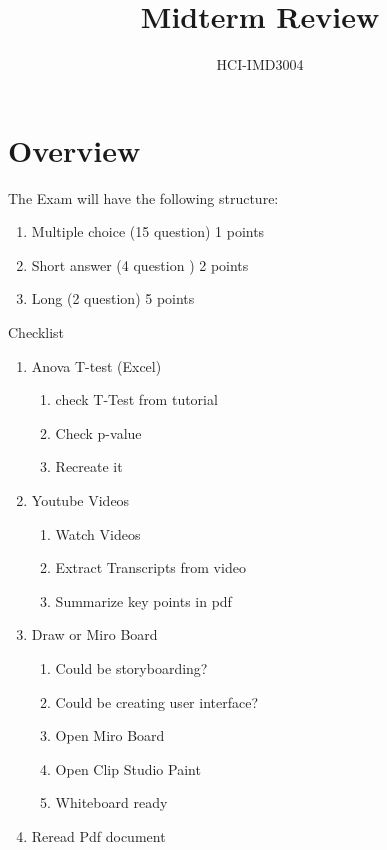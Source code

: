 \documentclass{article}
\begin{document}
\title{Midterm Review}
\author{HCI-IMD3004}
\maketitle




\section*{Overview}
The Exam will have the following structure:
\begin{enumerate}
\item Multiple choice (15 question) 1 points
\item Short answer (4 question ) 2 points
\item Long (2 question) 5 points
\end{enumerate}
Checklist
\begin{enumerate}
\item Anova T-test (Excel)
\begin{enumerate}
    \item check T-Test from tutorial 
    \item Check p-value
    \item Recreate it 
\end{enumerate}
    
\item Youtube Videos
\begin{enumerate}
    \item Watch Videos
    \item Extract Transcripts from video
    \item Summarize key points in pdf
\end{enumerate}
\item Draw or Miro Board
\begin{enumerate}
    \item Could be storyboarding?
    \item Could be creating user interface?
    \item Open Miro Board
    \item Open Clip Studio Paint 
    \item Whiteboard ready
\end{enumerate}

\item Reread Pdf document

\end{enumerate}

\newpage
\end{document}
